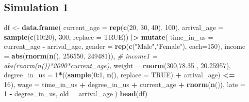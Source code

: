 \documentclass[
]{article}
\newenvironment{Shaded}{\begin{snugshade}}{\end{snugshade}}
\newcommand{\AttributeTok}[1]{\textcolor[rgb]{0.13,0.29,0.53}{#1}}
\newcommand{\CommentTok}[1]{\textcolor[rgb]{0.56,0.35,0.01}{\textit{#1}}}
\newcommand{\ConstantTok}[1]{\textcolor[rgb]{0.56,0.35,0.01}{#1}}
\newcommand{\DecValTok}[1]{\textcolor[rgb]{0.00,0.00,0.81}{#1}}
\newcommand{\FloatTok}[1]{\textcolor[rgb]{0.00,0.00,0.81}{#1}}
\newcommand{\FunctionTok}[1]{\textcolor[rgb]{0.13,0.29,0.53}{\textbf{#1}}}
\newcommand{\NormalTok}[1]{#1}
\newcommand{\OtherTok}[1]{\textcolor[rgb]{0.56,0.35,0.01}{#1}}
\newcommand{\SpecialCharTok}[1]{\textcolor[rgb]{0.81,0.36,0.00}{\textbf{#1}}}
\newcommand{\StringTok}[1]{\textcolor[rgb]{0.31,0.60,0.02}{#1}}
\begin{document}
\hypertarget{simulation-1}{%
\subsection{Simulation 1}\label{simulation-1}}

\begin{Shaded}
\begin{Highlighting}[]
\NormalTok{ df }\OtherTok{\textless{}{-}} \FunctionTok{data.frame}\NormalTok{(}
  \AttributeTok{current\_age =} \FunctionTok{rep}\NormalTok{(}\FunctionTok{c}\NormalTok{(}\DecValTok{20}\NormalTok{, }\DecValTok{30}\NormalTok{, }\DecValTok{40}\NormalTok{), }\DecValTok{100}\NormalTok{),}
  \AttributeTok{arrival\_age =} \FunctionTok{sample}\NormalTok{(}\FunctionTok{c}\NormalTok{(}\DecValTok{10}\SpecialCharTok{:}\DecValTok{20}\NormalTok{), }\DecValTok{300}\NormalTok{, }\AttributeTok{replace =} \ConstantTok{TRUE}\NormalTok{)) }\SpecialCharTok{|\textgreater{}}
  \FunctionTok{mutate}\NormalTok{(}
  \AttributeTok{time\_in\_us =}\NormalTok{ current\_age }\SpecialCharTok{{-}}\NormalTok{ arrival\_age,}
  \AttributeTok{gender =} \FunctionTok{rep}\NormalTok{(}\FunctionTok{c}\NormalTok{(}\StringTok{"Male"}\NormalTok{,}\StringTok{"Female"}\NormalTok{), }\AttributeTok{each=}\DecValTok{150}\NormalTok{),}
  \AttributeTok{income =} \FunctionTok{abs}\NormalTok{(}\FunctionTok{rnorm}\NormalTok{(}\FunctionTok{n}\NormalTok{(), }\DecValTok{256550}\NormalTok{, }\DecValTok{249481}\NormalTok{)),}
\CommentTok{\#  income1 = abs(rnorm(n())*2000*current\_age),}
  \AttributeTok{weight =} \FunctionTok{rnorm}\NormalTok{(}\DecValTok{300}\NormalTok{,}\FloatTok{78.35}\NormalTok{ , }\FloatTok{20.25957}\NormalTok{),}
  \AttributeTok{degree\_in\_us =} \DecValTok{1}\SpecialCharTok{*}\NormalTok{((}\FunctionTok{sample}\NormalTok{(}\DecValTok{0}\SpecialCharTok{:}\DecValTok{1}\NormalTok{, }\FunctionTok{n}\NormalTok{(), }\AttributeTok{replace =} \ConstantTok{TRUE}\NormalTok{) }\SpecialCharTok{+}\NormalTok{ arrival\_age) }\SpecialCharTok{\textless{}=} \DecValTok{16}\NormalTok{),}
  \AttributeTok{wage =}\NormalTok{ time\_in\_us }\SpecialCharTok{+}\NormalTok{ degree\_in\_us }\SpecialCharTok{+}\NormalTok{ current\_age }\SpecialCharTok{+} \FunctionTok{rnorm}\NormalTok{(}\FunctionTok{n}\NormalTok{()),}
  \AttributeTok{late =} \DecValTok{1} \SpecialCharTok{{-}}\NormalTok{ degree\_in\_us, }
  \AttributeTok{old =}\NormalTok{ arrival\_age}
\NormalTok{  )}
\FunctionTok{head}\NormalTok{(df)}
\end{Highlighting}
\end{Shaded}
\end{document}
